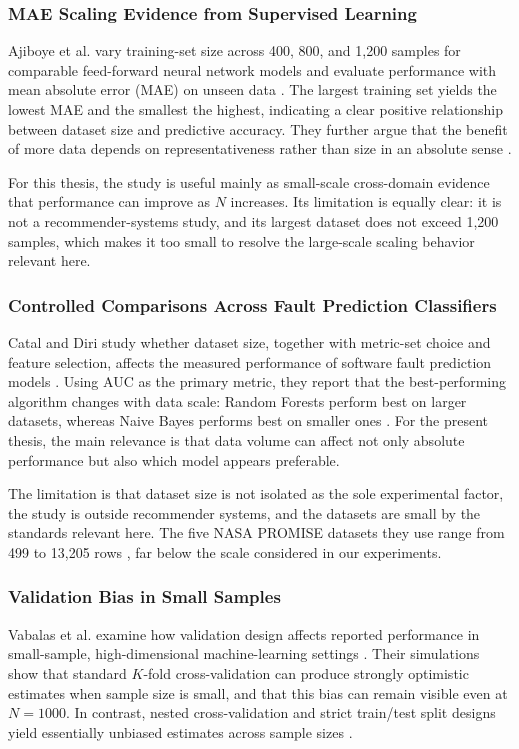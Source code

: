 \documentclass[12pt,a4paper]{article}
\begin{document}
\subsubsection{MAE Scaling Evidence from Supervised Learning}
Ajiboye et al. vary training-set size across 400, 800, and 1,200 samples for comparable feed-forward neural network models and evaluate performance with mean absolute error (MAE) on unseen data \cite{ajiboye2015}. The largest training set yields the lowest MAE and the smallest the highest, indicating a clear positive relationship between dataset size and predictive accuracy. They further argue that the benefit of more data depends on representativeness rather than size in an absolute sense \cite{ajiboye2015}.

For this thesis, the study is useful mainly as small-scale cross-domain evidence that performance can improve as $N$ increases. Its limitation is equally clear: it is not a recommender-systems study, and its largest dataset does not exceed 1,200 samples, which makes it too small to resolve the large-scale scaling behavior relevant here.

\subsubsection{Controlled Comparisons Across Fault Prediction Classifiers}
Catal and Diri study whether dataset size, together with metric-set choice and feature selection, affects the measured performance of software fault prediction models \cite{catal2009}. Using AUC as the primary metric, they report that the best-performing algorithm changes with data scale: Random Forests perform best on larger datasets, whereas Naive Bayes performs best on smaller ones \cite{catal2009}. For the present thesis, the main relevance is that data volume can affect not only absolute performance but also which model appears preferable.

The limitation is that dataset size is not isolated as the sole experimental factor, the study is outside recommender systems, and the datasets are small by the standards relevant here. The five NASA PROMISE datasets they use range from 499 to 13{,}205 rows \cite{nasapromise}, far below the scale considered in our experiments.

\subsubsection{Validation Bias in Small Samples}
Vabalas et al. examine how validation design affects reported performance in small-sample, high-dimensional machine-learning settings \cite{vabalas2019}. Their simulations show that standard $K$-fold cross-validation can produce strongly optimistic estimates when sample size is small, and that this bias can remain visible even at $N = 1000$. In contrast, nested cross-validation and strict train/test split designs yield essentially unbiased estimates across sample sizes \cite{vabalas2019}.
\end{document}
